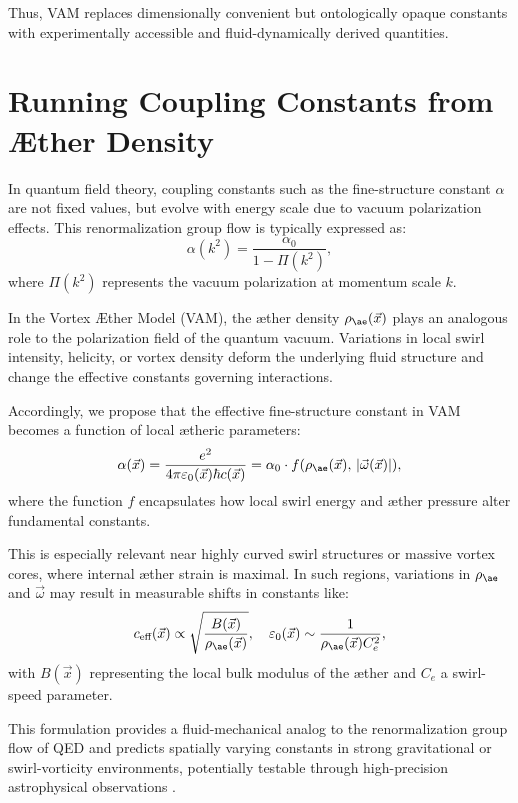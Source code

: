 Thus, VAM replaces dimensionally convenient but ontologically opaque constants with experimentally accessible and fluid-dynamically derived quantities.

\section{Running Coupling Constants from Æther Density}

In quantum field theory, coupling constants such as the fine-structure constant $\alpha$ are not fixed values, but evolve with energy scale due to vacuum polarization effects. This renormalization group flow is typically expressed as:
\begin{equation}
\alpha(k^2) = \frac{\alpha_0}{1 - \Pi(k^2)},
\end{equation}
where $\Pi(k^2)$ represents the vacuum polarization at momentum scale $k$.

In the Vortex Æther Model (VAM), the æther density $\rho_{\ae}(\vec{x})$ plays an analogous role to the polarization field of the quantum vacuum. Variations in local swirl intensity, helicity, or vortex density deform the underlying fluid structure and change the effective constants governing interactions.

Accordingly, we propose that the effective fine-structure constant in VAM becomes a function of local ætheric parameters:
\begin{equation}
\alpha(\vec{x}) = \frac{e^2}{4\pi \varepsilon_0(\vec{x}) \hbar c(\vec{x})} = \alpha_0 \cdot f(\rho_{\ae}(\vec{x}), \, |\vec{\omega}(\vec{x})|),
\end{equation}
where the function $f$ encapsulates how local swirl energy and æther pressure alter fundamental constants.

This is especially relevant near highly curved swirl structures or massive vortex cores, where internal æther strain is maximal. In such regions, variations in $\rho_{\ae}$ and $\vec{\omega}$ may result in measurable shifts in constants like:
\begin{equation}
c_{\text{eff}}(\vec{x}) \propto \sqrt{\frac{B(\vec{x})}{\rho_{\ae}(\vec{x})}}, \quad \varepsilon_0(\vec{x}) \sim \frac{1}{\rho_{\ae}(\vec{x}) C_e^2},
\end{equation}
with $B(\vec{x})$ representing the local bulk modulus of the æther and $C_e$ a swirl-speed parameter.

This formulation provides a fluid-mechanical analog to the renormalization group flow of QED and predicts spatially varying constants in strong gravitational or swirl-vorticity environments, potentially testable through high-precision astrophysical observations \cite{verlinde2016emergent, shapiro2004variation, uzan2011varying}.


